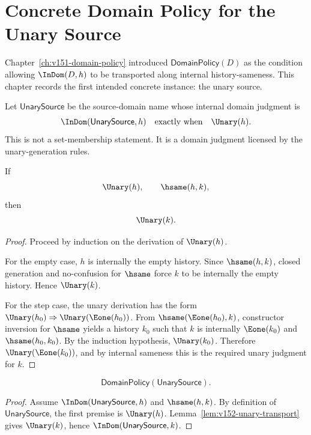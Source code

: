 
\chapter{Concrete Domain Policy for the Unary Source}
\label{ch:v152-unary-domain-policy}

Chapter~\ref{ch:v151-domain-policy} introduced \(\mathsf{DomainPolicy}(D)\) as the condition allowing \(\InDom(D,h)\) to be transported along internal history-sameness. This chapter records the first intended concrete instance: the unary source.

\begin{definition}
Let \(\mathsf{UnarySource}\) be the source-domain name whose internal domain judgment is
\[
  \InDom(\mathsf{UnarySource},h)
  \quad\text{exactly when}\quad
  \Unary(h).
\]
This is not a set-membership statement. It is a domain judgment licensed by the unary-generation rules.
\end{definition}

\begin{lemma}
\label{lem:v152-unary-transport}
If
\[
  \Unary(h),\qquad \hsame(h,k),
\]
then
\[
  \Unary(k).
\]
\end{lemma}

\begin{proof}
Proceed by induction on the derivation of \(\Unary(h)\).

For the empty case, \(h\) is internally the empty history. Since \(\hsame(h,k)\), closed generation and no-confusion for \(\hsame\) force \(k\) to be internally the empty history. Hence \(\Unary(k)\).

For the step case, the unary derivation has the form \(\Unary(h_0)\Rightarrow\Unary(\Eone(h_0))\). From \(\hsame(\Eone(h_0),k)\), constructor inversion for \(\hsame\) yields a history \(k_0\) such that \(k\) is internally \(\Eone(k_0)\) and \(\hsame(h_0,k_0)\). By the induction hypothesis, \(\Unary(k_0)\). Therefore \(\Unary(\Eone(k_0))\), and by internal sameness this is the required unary judgment for \(k\).
\end{proof}

\begin{theorem}
\label{thm:v152-unary-domain-policy}
\[
  \mathsf{DomainPolicy}(\mathsf{UnarySource}).
\]
\end{theorem}

\begin{proof}
Assume \(\InDom(\mathsf{UnarySource},h)\) and \(\hsame(h,k)\). By definition of \(\mathsf{UnarySource}\), the first premise is \(\Unary(h)\). Lemma~\ref{lem:v152-unary-transport} gives \(\Unary(k)\), hence \(\InDom(\mathsf{UnarySource},k)\).
\end{proof}

